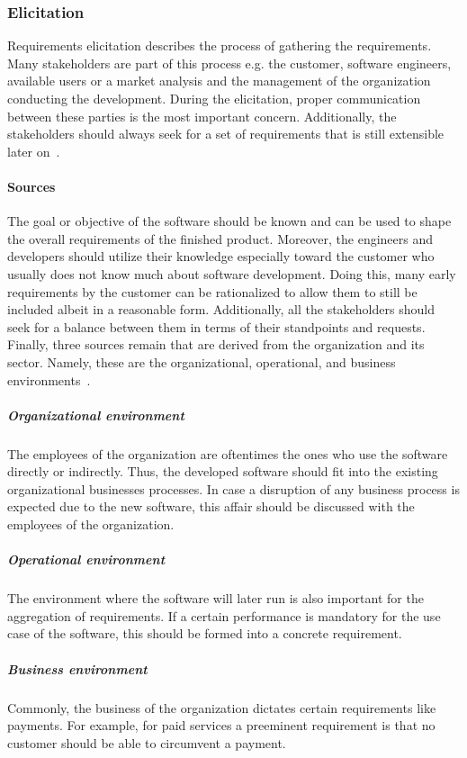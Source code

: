 \documentclass[12pt,a4paper,twoside]{report}
\begin{document}
\subsubsection{Elicitation}
Requirements elicitation describes the process of gathering the requirements.
Many stakeholders are part of this process e.g. the customer, software engineers,
available users or a market analysis and the management of the organization conducting
the development.
During the elicitation, proper communication between these parties is the most important
concern. Additionally, the stakeholders should always seek for a set of
requirements that is still extensible later on~\cite{swebok}.

\paragraph{Sources}
The goal or objective of the software should be known and can be used to
shape the overall requirements of the finished product.
Moreover, the engineers and developers should utilize their knowledge especially
toward the customer who usually does not know much about software development.
Doing this, many early requirements by the customer can be rationalized to allow
them to still be included albeit in a reasonable form.
Additionally, all the stakeholders should seek for a balance between them in
terms of their standpoints and requests.\\
Finally, three sources remain that are derived from the organization and its sector.
Namely, these are the organizational, operational, and business environments~\cite{swebok}.

\subparagraph{Organizational environment}
The employees of the organization are oftentimes the ones who use the software
directly or indirectly. Thus, the developed software should fit into the existing
organizational businesses processes. In case a disruption of any business process
is expected due to the new software, this affair should be discussed with the
employees of the organization.

\subparagraph{Operational environment}
The environment where the software will later run is also important for the
aggregation of requirements. If a certain performance is mandatory for the use case
of the software, this should be formed into a concrete requirement.

\subparagraph{Business environment}
Commonly, the business of the organization dictates certain requirements like
payments. For example, for paid services a preeminent requirement is that
no customer should be able to circumvent a payment.
\end{document}
